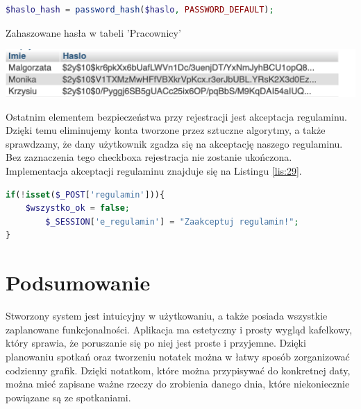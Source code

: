 \documentclass[eng,printmode,openany,oneside]{mgr}
\begin{document}
	
\begin{lstlisting}[caption={Haszowanie hasła}, language=PHP, label={lis:28}]
$haslo_hash = password_hash($haslo, PASSWORD_DEFAULT);
\end{lstlisting}
	
	
	
	
	\begin{table}[H]
		\centering
		\caption{Zahaszowane hasła w tabeli 'Pracownicy'}
		\includegraphics[width=1\textwidth]{haszowanie_tabela}
		\label{tab:9}
	\end{table}
	
	
	

	
	

	
Ostatnim elementem bezpieczeństwa przy rejestracji jest akceptacja regulaminu. Dzięki temu eliminujemy konta tworzone przez sztuczne algorytmy, a także sprawdzamy, że dany użytkownik zgadza się na akceptację naszego regulaminu. Bez zaznaczenia tego checkboxa rejestracja nie zostanie ukończona. Implementacja akceptacji regulaminu znajduje się na Listingu \ref{lis:29}.
	

	
\begin{lstlisting}[caption={Implementacja sprawdzenia czy regulamin został zaakceptowany}, language=PHP, label={lis:29}]
if(!isset($_POST['regulamin'])){
	$wszystko_ok = false;
    	$_SESSION['e_regulamin'] = "Zaakceptuj regulamin!";
}
\end{lstlisting}
	
		
	
	
	
\chapter{Podsumowanie}

Stworzony system jest intuicyjny w użytkowaniu, a także posiada wszystkie zaplanowane funkcjonalności. Aplikacja ma estetyczny i prosty wygląd kafelkowy, który sprawia, że poruszanie się po niej jest proste i przyjemne. Dzięki planowaniu spotkań oraz tworzeniu notatek można w łatwy sposób zorganizować codzienny grafik. Dzięki notatkom, które można przypisywać do konkretnej daty, można mieć zapisane ważne rzeczy do zrobienia danego dnia, które niekoniecznie powiązane są ze spotkaniami.
\end{document}
